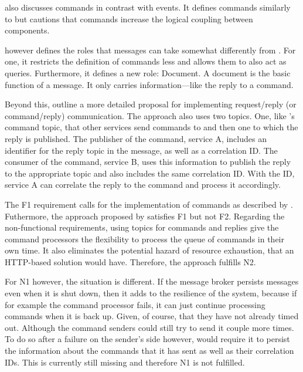 \cite[185--186]{millett_patterns_2015} also discusses commands in contrast with events.
It defines commands similarly to \cite[]{stopford_designing_2018} but cautions that commands increase the logical coupling between components.

\cite[86]{richardson_microservices_2019} however defines the roles that messages can take somewhat differently from \cite[]{stopford_designing_2018}.
For one, it restricts the definition of commands less and allows them to also act as queries.
Furthermore, it defines a new role: Document.
A document is the basic function of a message.
It only carries information---like the reply to a command.

Beyond this, \cite[87--90]{richardson_microservices_2019} outline a more detailed proposal for implementing request/reply (or command/reply) communication.
The approach also uses two topics.
One, like \citeauthor{stopford_designing_2018}'s command topic, that other services send commands to and then one to which the reply is published.
The publisher of the command, service A, includes an identifier for the reply topic in the message, as well as a correlation ID.
The consumer of the command, service B, uses this information to publish the reply to the appropriate topic and also includes the same correlation ID.
With the ID, service A can correlate the reply to the command and process it accordingly.

The F1 requirement calls for the implementation of commands as described by \citeauthor{stopford_designing_2018}.
Futhermore, the approach proposed by \citeauthor{richardson_microservices_2019} satisfies F1 but not F2.
Regarding the non-functional requirements, using topics for commands and replies give the command processors the flexibility to process the queue of commands in their own time.
It also eliminates the potential hazard of resource exhaustion, that an HTTP-based solution would have.
Therefore, the approach fulfills N2.

For N1 however, the situation is different.
If the message broker persists messages even when it is shut down, then it adds to the resilience of the system, because if for example the command processor fails, it can just continue processing commands when it is back up.
Given, of course, that they have not already timed out.
Although the command senders could still try to send it couple more times.
To do so after a failure on the sender's side however, would require it to persist the information about the commands that it has sent as well as their correlation IDs.
This is currently still missing and therefore N1 is not fulfilled.

